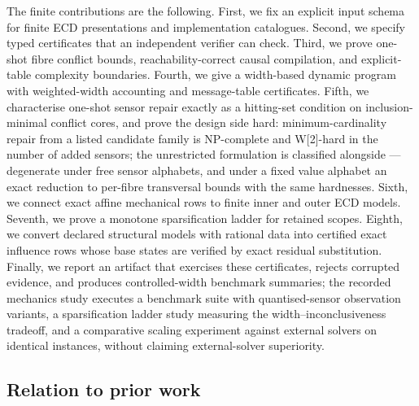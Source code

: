 \documentclass[11pt]{article}
\theoremstyle{plain}
\theoremstyle{definition}
\theoremstyle{remark}
\begin{document}
The finite contributions are the following.  First, we fix an explicit input
schema for finite ECD presentations and implementation catalogues.  Second, we
specify typed certificates that an independent verifier can check.  Third, we
prove one-shot fibre conflict bounds, reachability-correct causal compilation,
and explicit-table complexity boundaries.  Fourth, we give a width-based dynamic
program with weighted-width accounting and message-table certificates.  Fifth,
we characterise one-shot sensor repair exactly as a hitting-set condition on
inclusion-minimal conflict cores, and prove the design side hard:
minimum-cardinality repair from a listed candidate family is NP-complete and
W[2]-hard in the number of added sensors; the unrestricted formulation is
classified alongside --- degenerate under free sensor alphabets, and under a
fixed value alphabet an exact reduction to per-fibre transversal bounds with
the same hardnesses.  Sixth, we connect exact affine mechanical
rows to finite inner and outer ECD models.  Seventh, we prove a monotone
sparsification ladder for retained scopes.  Eighth, we convert declared
structural models with rational data into certified exact influence rows whose
base states are verified by exact residual substitution.
Finally, we report an artifact that exercises these certificates, rejects
corrupted evidence, and produces controlled-width benchmark summaries; the
recorded mechanics study executes a benchmark suite with quantised-sensor
observation variants, a sparsification ladder study measuring the
width--inconclusiveness tradeoff, and a comparative scaling experiment against
external solvers on identical instances, without claiming external-solver
superiority.

\subsection*{Relation to prior work}
\end{document}
